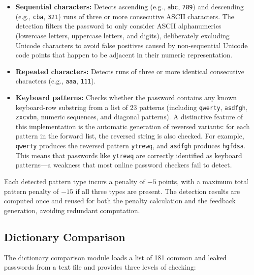 \begin{itemize}
    \item \textbf{Sequential characters:} Detects ascending (e.g., \texttt{abc}, \texttt{789}) and descending (e.g., \texttt{cba}, \texttt{321}) runs of three or more consecutive ASCII characters. The detection filters the password to only consider ASCII alphanumerics (lowercase letters, uppercase letters, and digits), deliberately excluding Unicode characters to avoid false positives caused by non-sequential Unicode code points that happen to be adjacent in their numeric representation.

    \item \textbf{Repeated characters:} Detects runs of three or more identical consecutive characters (e.g., \texttt{aaa}, \texttt{111}).

    \item \textbf{Keyboard patterns:} Checks whether the password contains any known keyboard-row substring from a list of 23 patterns (including \texttt{qwerty}, \texttt{asdfgh}, \texttt{zxcvbn}, numeric sequences, and diagonal patterns). A distinctive feature of this implementation is the automatic generation of reversed variants: for each pattern in the forward list, the reversed string is also checked. For example, \texttt{qwerty} produces the reversed pattern \texttt{ytrewq}, and \texttt{asdfgh} produces \texttt{hgfdsa}. This means that passwords like \texttt{ytrewq} are correctly identified as keyboard patterns---a weakness that most online password checkers fail to detect.
\end{itemize}

Each detected pattern type incurs a penalty of $-5$ points, with a maximum total pattern penalty of $-15$ if all three types are present. The detection results are computed once and reused for both the penalty calculation and the feedback generation, avoiding redundant computation.

\subsection{Dictionary Comparison}

The dictionary comparison module loads a list of 181 common and leaked passwords from a text file and provides three levels of checking:

